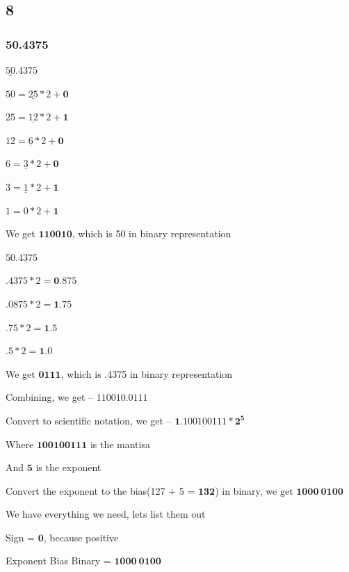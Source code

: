 \documentclass{article}
\begin{document}
    \subsection*{8}

    \subsubsection*{50.4375}

    $\underline{50}.4375$

    $50 = \underline{25} * 2 + \mathbf{0}$

    $25 = \underline{12} * 2 + \mathbf{1}$

    $12 = \underline{6} * 2 + \mathbf{0}$

    $6 = \underline{3} * 2 + \mathbf{0}$

    $3 = \underline{1} * 2 + \mathbf{1}$

    $1 = 0 * 2 + \mathbf{1}$

    We get $\mathbf{110010}$, which is 50 in binary representation

    \vspace*{0.1in}

    $50\underline{.4375}$

    $.4375 * 2 = \mathbf{0}.875$

    $.0875 * 2 = \mathbf{1}.75$

    $.75 * 2 = \mathbf{1}.5$

    $.5 * 2 = \mathbf{1}.0$

    We get $\mathbf{0111}$, which is .4375 in binary representation

    \vspace*{0.1in}

    Combining, we get -- $\mathbf{110010.0111}$

    Convert to scientific notation, we get -- $\mathbf{1\underline{.100100111} * 2^{\underline{5}}}$

    Where $\mathbf{100100111}$ is the mantisa

    And $\mathbf{5}$ is the exponent

    Convert the exponent to the bias(127 + 5 = $\mathbf{132}$) in binary, we get $\mathbf{1000\: 0100}$

    We have everything we need, lets list them out

    \vspace*{0.1in}

    Sign = $\mathbf{0}$, because positive

    Exponent Bias Binary = $\mathbf{1000\: 0100}$
\end{document}
